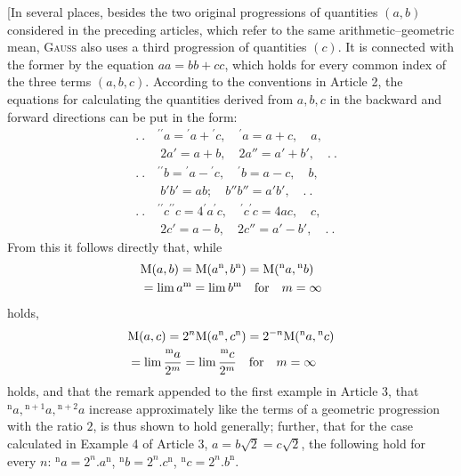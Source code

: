 [In several places, besides the two original progressions of quantities $(a,b)$ considered in the preceding articles, which refer to the same arithmetic–geometric mean, \textsc{Gauss} also uses a third progression of quantities $(c)$. It is connected with the former by the equation $aa=bb+cc$, which holds for every common index of the three terms $(a,b,c)$. According to the conventions in Article 2, the equations for calculating the quantities derived from $a,b,c$ in the backward and forward directions can be put in the form:
\[
\begin{aligned}&.\ .\quad{}^{\prime\prime}a={}^\prime a+{}^\prime c,\quad{}^\prime a=a+c,\quad a,\\&\qquad2a'=a+b,\quad2a''=a'+b',\quad.\ .\\[9pt]&.\ .\quad{}^{\prime\prime}b={}^\prime a-{}^\prime c,\quad{}^\prime b=a-c,\quad b,\\&\qquad b'b'=ab; \quad b''b''=a'b',\quad.\ .\\[9pt]&.\ .\quad{}^{\prime\prime}c{}^{\prime\prime}c=4{}^\prime a{}^\prime c,\quad{}^\prime c{}^\prime c=4ac,\quad c,\\&\qquad2c'=a-b,\quad2c''=a'-b',\quad.\ .\end{aligned}
\]
From this it follows directly that, while
\[
\begin{aligned}&\mathrm{M}(a,b)=\mathrm{M}(a^{\mathrm{n}},b^{\mathrm{n}})=\mathrm{M}({}^{\mathrm{n}}a,{}^{\mathrm{n}}b)\\&=\lim a^{\mathrm{m}}=\lim b^{\mathrm{m}}\quad\hbox{for}\quad m=\infty\end{aligned}
\]
holds,
\[
\begin{aligned}&\mathrm{M}(a,c)=2^n\mathrm{M}(a^{\mathrm{n}},c^{\mathrm{n}})=2^{-n}\mathrm{M}({}^{\mathrm{n}}a,{}^{\mathrm{n}}c)\\&=\lim\frac{{}^{\mathrm{m}}a}{2^m}=\lim\frac{{}^{\mathrm{m}}c}{2^m}\quad\hbox{for}\quad m=\infty\end{aligned}
\]
holds, and that the remark appended to the first example in Article 3, that ${}^{\mathrm{n}}a,{}^{\mathrm{n}+1}a,{}^{\mathrm{n}+2}a$ increase approximately like the terms of a geometric progression with the ratio $2$, is thus shown to hold generally; further, that for the case calculated in Example 4 of Article 3, $a=b\surd2=c\surd2$, the following hold for every $n$: ${}^{\mathrm{n}}a=2^n.a^{\mathrm{n}}$, ${}^{\mathrm{n}}b=2^n.c^{\mathrm{n}}$, ${}^{\mathrm{n}}c=2^n.b^{\mathrm{n}}$.

